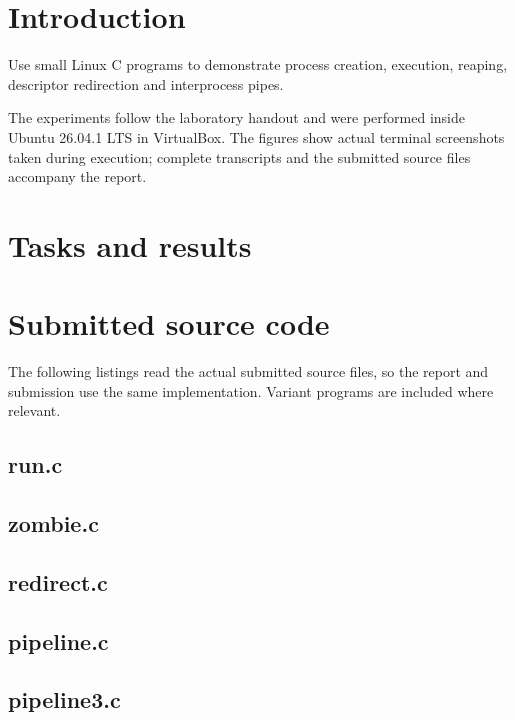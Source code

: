 \documentclass{tum_report}
\begin{document}

\tableofcontents
\thispagestyle{empty}
\clearpage
\chapter{Introduction}
Use small Linux C programs to demonstrate process creation, execution, reaping, descriptor redirection and interprocess pipes.

The experiments follow the laboratory handout and were performed inside Ubuntu 26.04.1 LTS in VirtualBox. The figures show actual terminal screenshots taken during execution; complete transcripts and the submitted source files accompany the report.
\chapter{Tasks and results}

\clearpage

\par\vspace{0.8cm}

\clearpage
\appendix
\chapter{Submitted source code}
The following listings read the actual submitted source files, so the report and submission use the same implementation. Variant programs are included where relevant.
\Needspace{362pt}
\section{run.c}

\Needspace{373pt}
\section{zombie.c}

\Needspace{351pt}
\section{redirect.c}

\Needspace{527pt}
\section{pipeline.c}

\Needspace{582pt}
\section{pipeline3.c}

\end{document}

